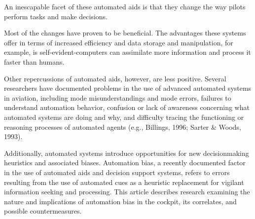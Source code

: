 \documentclass[utf8,bachelor,manualbib]{gradu3}
\begin{document}
An inescapable facet of these automated aids is that they change the way pilots perform tasks and make decisions.

Most of the changes have proven to be beneficial. The advantages these systems
offer in terms of increased efficiency and data storage and manipulation, for
example, is self-evident-computers can assimilate more information and process
it faster than humans.

Other repercussions of automated aids, however, are less positive. Several
researchers have documented problems in the use of advanced automated systems
in aviation, including mode misunderstandings and mode errors, failures to understand automation behavior, confusion or lack of awareness concerning what automated systems are doing and why, and difficulty tracing the functioning or
reasoning processes of automated agents (e.g., Billings, 1996; Sarter \& Woods,
1993).

Additionally, automated systems introduce opportunities for new decisionmaking heuristics and associated biases. Automation bias, a recently documented
factor in the use of automated aids and decision support systems, refers to errors
resulting from the use of automated cues as a heuristic replacement for vigilant
information seeking and processing. This article describes research examining the
nature and implications of automation bias in the cockpit, its correlates, and possible countermeasures. \citep{mosierym1998}
\end{document}
